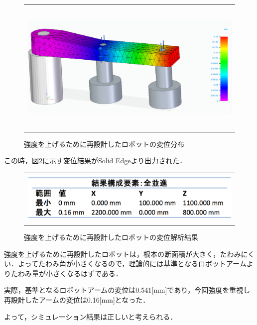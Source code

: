 \begin{figure}[htbp]
  \begin{center}
    \begin{tabular}{c}
      \includegraphics[height=6.5cm]{img/eps/strong-heni.eps}
    \end{tabular}
    \caption{強度を上げるために再設計したロボットの変位分布}
    \label{strong-heni}
  \end{center}
\end{figure}

この時，図\ref{strong-heni-result}に示す変位結果がSolid
Edgeより出力された．

\begin{figure}[htbp]
  \begin{center}
    \begin{tabular}{c}
      \includegraphics[height=2.5cm]{img/eps/strong-heni-result.eps}
    \end{tabular}
    \caption{強度を上げるために再設計したロボットの変位解析結果}
    \label{strong-heni-result}
  \end{center}
\end{figure}

強度を上げるために再設計したロボットは，根本の断面積が大きく，たわみにくい．よってたわみ角が小さくなるので，理論的には基準となるロボットアームよりたわみ量が小さくなるはずである．

実際，基準となるロボットアームの変位は0.541{[}mm{]}であり，今回強度を重視し再設計したアームの変位は0.16{[}mm{]}となった．

よって，シミュレーション結果は正しいと考えられる．

